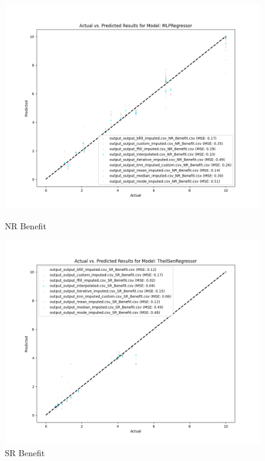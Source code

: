 \begin{figure}[H]
    \centering
    \begin{minipage}{0.495\textwidth}
        \centering
        \includegraphics[width=\linewidth]{reg_section_specxtra/images_reg_training/NR_Benefit_MLPRegressor_plot.png}
        \caption{NR Benefit}
        \label{fig_reg_specxtra:nr_ben_reg_training}
    \end{minipage}\hfill
    \begin{minipage}{0.495\textwidth}
        \centering
        \includegraphics[width=\linewidth]{reg_section_specxtra/images_reg_training/SR_Benefit_TheilSenRegressor_plot.png}
        \caption{SR Benefit}
        \label{fig_reg_specxtra:sr_ben_reg_training}
    \end{minipage}
\end{figure}

